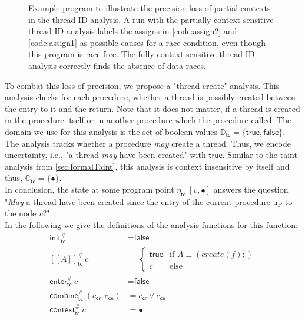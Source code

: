   \begin{figure}
    \centering
    \begin{subfigure}{.35\textwidth}
      \centering
      
    \end{subfigure}
    \caption{Example program to illustrate the precision loss of partial contexts in the thread ID analysis. A run with the partially context-sensitive thread ID analysis labels the assigns in \autoref{code:assign2} and \autoref{code:assign1} as possible causes for a race condition, even though this program is race free. The fully context-sensitive thread ID analysis correctly finds the absence of data races.}
    \label{fig:example_thread}
  \end{figure}

  To combat this loss of precision, we propose a "thread-create" analysis. This analysis checks for each procedure, whether a thread is possibly created between the entry to it and the return. Note that it does not matter, if a thread is created in the procedure itself or in another procedure which the procedure called. The domain we use for this analysis is the set of boolean values $\mathbb{D}_\textsf{tc} = \{\textsf{true}, \textsf{false}\}$. The analysis tracks whether a procedure \textit{may} create a thread. Thus, we encode uncertainty, i.e., "a thread \textit{may} have been created" with $\textsf{true}$. Similar to the taint analysis from \autoref{sec:formalTaint}, this analysis is context insensitive by itself and thus, $\mathbb{C}_\textsf{tc} = \{\bullet\}$.\\
  In conclusion, the state at some program point $\eta_\textsf{tc}\ [v,\bullet]$ answers the question "\textit{May} a thread have been created since the entry of the current procedure up to the node $v$?".\\
  In the following we give the definitions of the analysis functions for this function:
  \begin{align*}
    \textsf{init}^{\#}_\textsf{tc} &= \textsf{false}\\
    [\![ A ]\!]^{\#}_\textsf{tc}\ c &= \left\{ \begin{array}{ll}
      \textsf{true} & \text{if }A \equiv (create(f);)\\
      c & \text{else}
    \end{array} \right. \\
    \textsf{enter}^{\#}_\textsf{tc}\ c &= \textsf{false}\\
    \textsf{combine}^{\#}_\textsf{tc}\ (c_\textsf{cr}, c_\textsf{ce}) &= c_\textsf{cr} \lor c_\textsf{ce}\\
    \textsf{context}^{\#}_\textsf{tc}\ c &= \bullet\\
  \end{align*}
  
